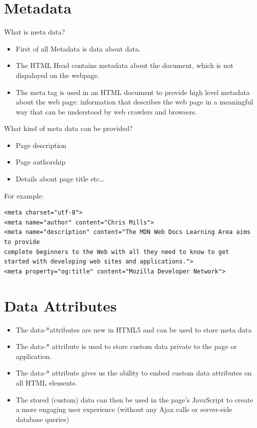 \documentclass[11pt]{article}
\begin{document}
\section{Metadata}
\label{sec:org5b22aa4}
What is meta data?
\begin{itemize}
\item First of all Metadata is data about data.
\item The HTML Head contains metadata about the document, which is not dispalayed on the webpage.
\item The meta tag is used in an HTML document to provide high level metadata about the web page: information that describes the web page in a meaningful way that can be understood by web crawlers and browsers.
\end{itemize}

What kind of meta data can be provided?
\begin{itemize}
\item Page description
\item Page authorship
\item Details about page title etc…
\end{itemize}

For example:
\lstset{breaklines=true,language=HTML,label= ,caption= ,captionpos=b,numbers=none}
\begin{lstlisting}
<meta charset="utf-8">
<meta name="author" content="Chris Mills">
<meta name="description" content="The MDN Web Docs Learning Area aims to provide
complete beginners to the Web with all they need to know to get
started with developing web sites and applications.">
<meta property="og:title" content="Mozilla Developer Network">
\end{lstlisting}
\section{Data Attributes}
\label{sec:org9ee9a0e}
\begin{itemize}
\item The data-*attributes are new in HTML5 and can be used to store meta data
\item The data-* attribute is used to store custom data private to the page or application.
\item The data-* attribute gives us the ability to embed custom data attributes on all HTML elements.
\item The stored (custom) data can then be used in the page's JavaScript to create a more engaging user experience (without any Ajax calls or server-side database queries)
\end{itemize}
\end{document}
